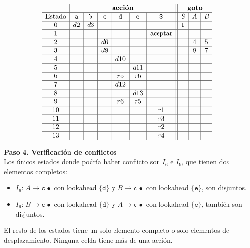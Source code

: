 \documentclass[12pt,letterpaper]{article}
\newcommand{\nt}[1]{\textit{#1}}
\newcommand{\tk}[1]{\texttt{#1}}
\begin{document}
\begin{enumerate}[label=\arabic*.]
  \[
  \begin{array}{c|c|c|c|c|c|c||c|c|c}
    & \multicolumn{6}{c||}{\textbf{acción}} & \multicolumn{3}{c}{\textbf{goto}} \\ \hline
    \text{Estado} & \tk{a} & \tk{b} & \tk{c} & \tk{d} & \tk{e} & \tk{\$} & \nt{S} & \nt{A} & \nt{B} \\ \hline
    0  & d2 & d3 &     &     &     &     & 1 &   &   \\ \hline
    1  &    &    &     &     &     & \text{aceptar} &   &   &   \\ \hline
    2  &    &    & d6  &     &     &     &   & 4 & 5 \\ \hline
    3  &    &    & d9  &     &     &     &   & 8 & 7 \\ \hline
    4  &    &    &     & d10 &     &     &   &   &   \\ \hline
    5  &    &    &     &     & d11 &     &   &   &   \\ \hline
    6  &    &    &     & r5  & r6  &     &   &   &   \\ \hline
    7  &    &    &     & d12 &     &     &   &   &   \\ \hline
    8  &    &    &     &     & d13 &     &   &   &   \\ \hline
    9  &    &    &     & r6  & r5  &     &   &   &   \\ \hline
    10 &    &    &     &     &     & r1  &   &   &   \\ \hline
    11 &    &    &     &     &     & r3  &   &   &   \\ \hline
    12 &    &    &     &     &     & r2  &   &   &   \\ \hline
    13 &    &    &     &     &     & r4  &   &   &   \\
  \end{array}
  \]

  \textbf{Paso 4. Verificación de conflictos}\\
  Los únicos estados donde podría haber conflicto son $I_6$ e $I_9$, que tienen dos elementos completos:
  \begin{itemize}
  \item $I_6$: $\nt{A}\to\tk{c}\,\bullet$ con lookahead $\{\tk{d}\}$ y $\nt{B}\to\tk{c}\,\bullet$ con lookahead
    $\{\tk{e}\}$, son disjuntos.
    
  \item $I_9$: $\nt{B}\to\tk{c}\,\bullet$ con lookahead $\{\tk{d}\}$ y $\nt{A}\to\tk{c}\,\bullet$ con lookahead
    $\{\tk{e}\}$, también son disjuntos.
  \end{itemize}
  El resto de los estados tiene un solo elemento completo o solo elementos de desplazamiento.
  Ninguna celda tiene más de una acción.\\


\end{enumerate}
\end{document}
